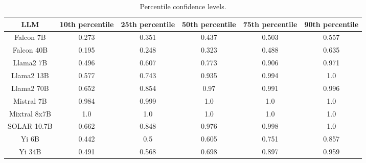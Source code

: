 \begin{table*}
\centering
\begin{tabular}{c|c|c|c|c|c}
LLM & 10th percentile & 25th percentile & 50th percentile & 75th percentile & 90th percentile\\ \hline
Falcon 7B & 0.273 & 0.351 & 0.437 & 0.503 & 0.557\\
Falcon 40B & 0.195 & 0.248 & 0.323 & 0.488 & 0.635\\
Llama2 7B & 0.496 & 0.607 & 0.773 & 0.906 & 0.971\\
Llama2 13B & 0.577 & 0.743 & 0.935 & 0.994 & 1.0\\
Llama2 70B & 0.652 & 0.854 & 0.97 & 0.991 & 0.996\\
Mistral 7B & 0.984 & 0.999 & 1.0 & 1.0 & 1.0\\
Mixtral 8x7B & 1.0 & 1.0 & 1.0 & 1.0 & 1.0\\
SOLAR 10.7B & 0.662 & 0.848 & 0.976 & 0.998 & 1.0\\
Yi 6B & 0.442 & 0.5 & 0.605 & 0.751 & 0.857\\
Yi 34B & 0.491 & 0.568 & 0.698 & 0.897 & 0.959\\
\hline
\end{tabular}
\caption{Percentile confidence levels.}
\label{tab:percentile_conf}
\end{table*}
